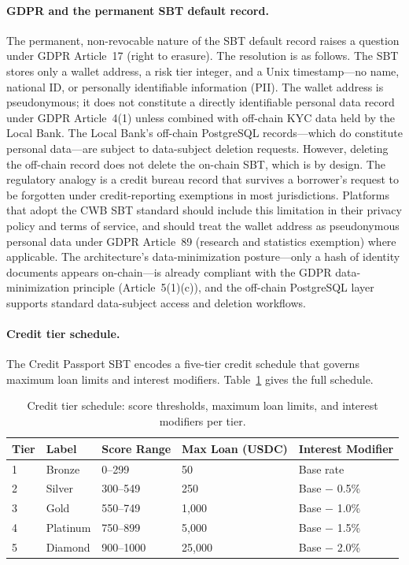 \documentclass[12pt,a4paper]{report}
\begin{document}
\paragraph{GDPR and the permanent SBT default record.}
The permanent, non-revocable nature of the SBT default record raises a question under GDPR Article~17 (right to erasure). The resolution is as follows. The SBT stores only a wallet address, a risk tier integer, and a Unix timestamp---no name, national ID, or personally identifiable information (PII). The wallet address is pseudonymous; it does not constitute a directly identifiable personal data record under GDPR Article~4(1) unless combined with off-chain KYC data held by the Local Bank. The Local Bank's off-chain PostgreSQL records---which do constitute personal data---are subject to data-subject deletion requests. However, deleting the off-chain record does not delete the on-chain SBT, which is by design. The regulatory analogy is a credit bureau record that survives a borrower's request to be forgotten under credit-reporting exemptions in most jurisdictions. Platforms that adopt the CWB SBT standard should include this limitation in their privacy policy and terms of service, and should treat the wallet address as pseudonymous personal data under GDPR Article~89 (research and statistics exemption) where applicable. The architecture's data-minimization posture---only a hash of identity documents appears on-chain---is already compliant with the GDPR data-minimization principle (Article~5(1)(c)), and the off-chain PostgreSQL layer supports standard data-subject access and deletion workflows.

\paragraph{Credit tier schedule.}
The Credit Passport SBT encodes a five-tier credit schedule that governs maximum loan limits and interest modifiers. Table~\ref{tab:credit-tiers} gives the full schedule.

\begin{table}[H]
\centering
\caption{Credit tier schedule: score thresholds, maximum loan limits, and interest modifiers per tier.}
\label{tab:credit-tiers}
\renewcommand{\arraystretch}{1.3}
\small
\begin{tabular}{p{0.8cm}p{2.2cm}p{2.6cm}p{3.2cm}p{3.8cm}}
\hline
\textbf{Tier} & \textbf{Label} & \textbf{Score Range} & \textbf{Max Loan (USDC)} & \textbf{Interest Modifier} \\
\hline
1 & Bronze & 0--299 & 50 & Base rate \\
\hline
2 & Silver & 300--549 & 250 & Base $-$ 0.5\% \\
\hline
3 & Gold & 550--749 & 1,000 & Base $-$ 1.0\% \\
\hline
4 & Platinum & 750--899 & 5,000 & Base $-$ 1.5\% \\
\hline
5 & Diamond & 900--1000 & 25,000 & Base $-$ 2.0\% \\
\hline
\end{tabular}
\end{table}
\end{document}
